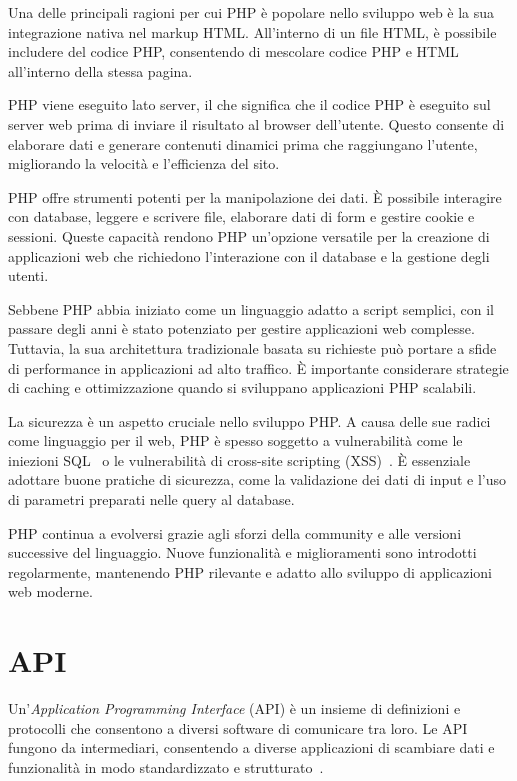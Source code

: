 Una delle principali ragioni per cui PHP è popolare nello sviluppo web è la sua integrazione nativa nel markup HTML. All'interno di un file HTML, è possibile includere del codice PHP, consentendo di mescolare codice PHP e HTML all'interno della stessa pagina.

PHP viene eseguito lato server, il che significa che il codice PHP è eseguito sul server web prima di inviare il risultato al browser dell'utente. Questo consente di elaborare dati e generare contenuti dinamici prima che raggiungano l'utente, migliorando la velocità e l'efficienza del sito.

PHP offre strumenti potenti per la manipolazione dei dati. È possibile interagire con database, leggere e scrivere file, elaborare dati di form e gestire cookie e sessioni. Queste capacità rendono PHP un'opzione versatile per la creazione di applicazioni web che richiedono l'interazione con il database e la gestione degli utenti.

Sebbene PHP abbia iniziato come un linguaggio adatto a script semplici, con il passare degli anni è stato potenziato per gestire applicazioni web complesse. Tuttavia, la sua architettura tradizionale basata su richieste può portare a sfide di performance in applicazioni ad alto traffico. È importante considerare strategie di caching e ottimizzazione quando si sviluppano applicazioni PHP scalabili.

La sicurezza è un aspetto cruciale nello sviluppo PHP. A causa delle sue radici come linguaggio per il web, PHP è spesso soggetto a vulnerabilità come le iniezioni SQL~\cite{Sql_Injection, SQL_Injection2} o le vulnerabilità di cross-site scripting (XSS)~\cite{XSS}. È essenziale adottare buone pratiche di sicurezza, come la validazione dei dati di input e l'uso di parametri preparati nelle query al database.

PHP continua a evolversi grazie agli sforzi della community e alle versioni successive del linguaggio. Nuove funzionalità e miglioramenti sono introdotti regolarmente, mantenendo PHP rilevante e adatto allo sviluppo di applicazioni web moderne.
\section{API}
Un'\emph{Application Programming Interface} (API) è un insieme di definizioni e protocolli che consentono a diversi software di comunicare tra loro. Le API fungono da intermediari, consentendo a diverse applicazioni di scambiare dati e funzionalità in modo standardizzato e strutturato~\cite{API}.

